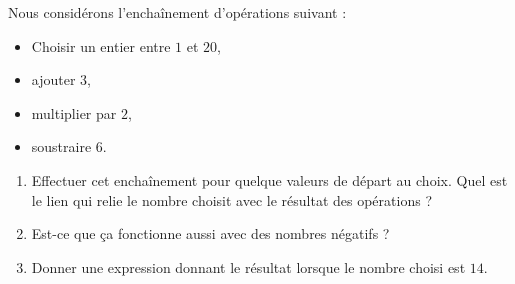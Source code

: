 
\begin{exercice}\label{exosmath-0753}

Nous considérons l'enchaînement d'opérations suivant :
\begin{itemize}
    \item Choisir un entier entre \( 1\) et \( 20\),
    \item ajouter \( 3\),
    \item multiplier par \( 2\),
    \item soustraire \( 6\).
\end{itemize}
\begin{enumerate}
    \item
        Effectuer cet enchaînement pour quelque valeurs de départ au choix. Quel est le lien qui relie le nombre choisit avec le résultat des opérations ?
    \item
        Est-ce que ça fonctionne aussi avec des nombres négatifs ?
    \item
        Donner une expression donnant le résultat lorsque le nombre choisi est $14$.
\end{enumerate}

\end{exercice}
